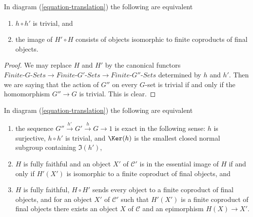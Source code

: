 \begin{lemma}
\label{lemma-composition-trivial}
In diagram (\ref{equation-translation}) the following are equivalent
\begin{enumerate}
\item $h \circ h'$ is trivial, and
\item the image of $H' \circ H$ consists of objects isomorphic to finite
coproducts of final objects.
\end{enumerate}
\end{lemma}

\begin{proof}
We may replace $H$ and $H'$ by the canonical functors
$\textit{Finite-}G\textit{-Sets} \to \textit{Finite-}G'\textit{-Sets}
\to \textit{Finite-}G''\textit{-Sets}$ determined by $h$ and $h'$.
Then we are saying that the action of $G''$ on every $G$-set is trivial
if and only if the homomorphism $G'' \to G$ is trivial. This is clear.
\end{proof}

\begin{lemma}
\label{lemma-functoriality-galois-ses}
In diagram (\ref{equation-translation}) the following are equivalent
\begin{enumerate}
\item the sequence $G'' \xrightarrow{h'} G' \xrightarrow{h} G \to 1$
is exact in the following sense: $h$ is surjective, $h \circ h'$ is trivial,
and $\Ker(h)$ is the smallest closed normal subgroup containing $\Im(h')$,
\item $H$ is fully faithful and an object $X'$ of $\mathcal{C}'$ is in
the essential image of $H$ if and only if $H'(X')$ is isomorphic to a
finite coproduct of final objects, and
\item $H$ is fully faithful, $H \circ H'$ sends every object to a finite
coproduct of final objects, and for an object $X'$ of $\mathcal{C}'$
such that $H'(X')$ is a finite coproduct of final objects there exists
an object $X$ of $\mathcal{C}$ and an epimorphism $H(X) \to X'$.
\end{enumerate}
\end{lemma}

